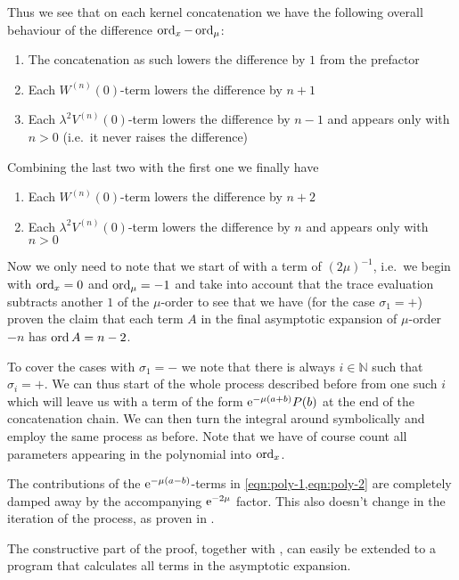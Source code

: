 \begin{MainTheorem}
\begin{Proof}
    Thus we see that on each kernel concatenation we have the following overall
    behaviour of the difference $\operatorname{ord}_x - \operatorname{ord}_\mu$: 
    \begin{enumerate}
      \item The concatenation as such lowers the difference by $1$ from the
        prefactor
      \item Each $W^{(n)}(0)$-term lowers the difference by $n+1$
      \item Each $\lambda^2 V^{(n)}(0)$-term lowers the difference by $n-1$ and
        appears only with $n > 0$ (i.e.\ it never raises the difference)
    \end{enumerate}
    Combining the last two with the first one we finally have
    \begin{enumerate}
      \item Each $W^{(n)}(0)$-term lowers the difference by $n+2$
      \item Each $\lambda^2 V^{(n)}(0)$-term lowers the difference by $n$ and
        appears only with $n > 0$
    \end{enumerate}
    Now we only need to note that we start of with a term of $(2\mu)^{-1}$,
    i.e.\ we begin with $\operatorname{ord}_x = 0$ and $\operatorname{ord}_\mu = -1$ and take into account
    that the trace evaluation subtracts another $1$ of the $\mu$-order to see
    that we have (for the case $\sigma_1 = +$) proven the claim that each term
    $A$ in the final asymptotic expansion of $\mu$-order $-n$ has $\operatorname{ord} A = n -
    2$.

    To cover the cases with $\sigma_1 = -$ we note that there is always
    $i\in\mathbb{N}$ such that $\sigma_i = +$. We can thus start of the whole
    process described before from one such $i$ which will leave us with a term
    of the form $\mathrm e^{-\mu(a+b)}P(b)$ at the end of the concatenation chain. We
    can then turn the integral around symbolically and employ the same process
    as before. Note that we have of course count all parameters appearing in the
    polynomial into $\operatorname{ord}_x$.

    The contributions of the $\mathrm e^{-\mu(a-b)}$-terms in
    \cref{eqn:poly-1,eqn:poly-2} are completely damped away by the accompanying
    $\mathrm e^{-2\mu}$ factor. This also doesn't change in the iteration of the
    process, as proven in .
  \end{Proof}
\end{MainTheorem}
The constructive part of the proof, together with , can
easily be extended to a program that calculates all terms in the asymptotic
expansion.
